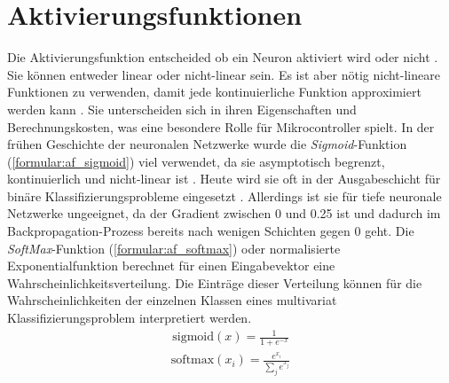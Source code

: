 \newpage
\section{Aktivierungsfunktionen}
Die Aktivierungsfunktion entscheided ob ein Neuron aktiviert wird oder nicht \cite{nwankpa2018activation}.
Sie können entweder linear oder nicht-linear sein.
Es ist aber nötig nicht-lineare Funktionen zu verwenden, damit jede kontinuierliche Funktion approximiert werden kann \cite{apicella2021survey}.
Sie unterscheiden sich in ihren Eigenschaften und Berechnungskosten, was eine besondere Rolle für Mikrocontroller spielt.
\newline
\newline
In der frühen Geschichte der neuronalen Netzwerke wurde die \textit{Sigmoid}-Funktion (\ref{formular:af_sigmoid}) viel verwendet, da sie asymptotisch begrenzt,
kontinuierlich und nicht-linear ist \cite{apicella2021survey}.
Heute wird sie oft in der Ausgabeschicht für binäre Klassifizierungsprobleme eingesetzt \cite{nwankpa2018activation}.
Allerdings ist sie für tiefe neuronale Netzwerke ungeeignet, da der Gradient zwischen 0 und 0.25 ist und dadurch im
Backpropagation-Prozess bereits nach wenigen Schichten gegen 0 geht.
Die \textit{SoftMax}-Funktion (\ref{formular:af_softmax}) oder normalisierte Exponentialfunktion berechnet für einen Eingabevektor eine Wahrscheinlichkeitsverteilung.
Die Einträge dieser Verteilung können für die Wahrscheinlichkeiten der einzelnen Klassen eines multivariat Klassifizierungsproblem interpretiert werden.
\begin{align}
    \label{formular:af_sigmoid}
    \text{sigmoid}(x) = \frac{1}{1 + e^{-x}}
\end{align}
\begin{align}
    \label{formular:af_softmax}
    \text{softmax}(x_i) = \frac{e^{x_i}}{\sum_j e^{x_j}}
\end{align}
